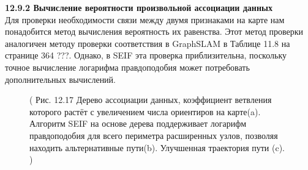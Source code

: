\documentclass[10pt,a4paper]{article}
\begin{document}
\textbf{12.9.2	Вычисление вероятности произвольной ассоциации данных}\\

Для проверки необходимости связи между двумя признаками на карте нам понадобится метод вычисления вероятность их равенства. Этот метод проверки аналогичен методу проверки соответствия в GraphSLAM  в Таблице 11.8 на странице 364 ???. Однако, в SEIF эта проверка приблизительна, поскольку точное вычисление логарифма правдоподобия может потребовать дополнительных вычислений.

\begin{figure}[H]
	\caption{ ( Рис. 12.17   Дерево ассоциации данных,  коэффициент ветвления которого растёт с увеличением числа ориентиров на карте(a). Алгоритм SEIF на основе дерева поддерживает логарифм правдоподобия для всего периметра расширенных узлов, позволяя находить альтернативные пути(b).  Улучшенная траектория пути (c). ) }
	\label{fig:1217orig}
\end{figure}
\end{document}
